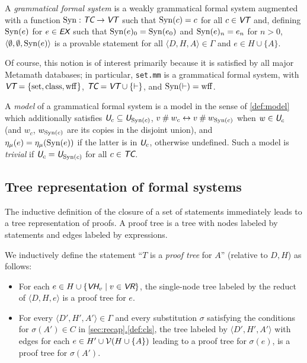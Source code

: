 \documentclass[runningheads,a4paper]{llncs}
\newcommand{\vr}{\textit{\textsf{VR}}} %
\newcommand{\ex}{\textit{\textsf{EX}}} %
\newcommand{\vh}{\textit{\textsf{VH}}} %
\newcommand{\tc}{\textit{\textsf{TC}}} %
\newcommand{\vt}{\textit{\textsf{VT}}} %
\newcommand{\uv}{\textit{\textsf{U}}} %
\newcommand{\ang}[1]{\langle#1\rangle}
\newcommand{\syn}{{\rm Syn}}
\newcommand{\fresh}{\mathbin{\#}}
\begin{document}
\begin{definition}
A {\em grammatical formal system} is a weakly grammatical formal system augmented with a function $\syn:\tc\to\vt$ such that $\syn(c)=c$ for all $c\in\vt$ and, defining $\syn(e)$ for $e\in\ex$ such that $\syn(e)_0=\syn(e_0)$ and $\syn(e)_n=e_n$ for $n>0$, $\ang{\emptyset,\emptyset,\syn(e)}$ is a provable statement for all $\ang{D,H,A}\in\Gamma$ and $e\in H\cup\{A\}$.
\end{definition}

\begin{remark}
Of course, this notion is of interest primarily because it is satisfied by all major Metamath databases; in particular, \texttt{set.mm} is a grammatical formal system, with $\vt={\rm \{set,class,wff\}}$, $\tc=\vt\cup\{\vdash\}$, and $\syn(\vdash)={\rm wff}$.
\end{remark}

\begin{definition}\label{def:gmodel}
A {\em model} of a grammatical formal system is a model in the sense of \autoref{def:model} which additionally satisfies $\uv_c\subseteq\uv_{\syn(c)}$, $v\fresh w_c\leftrightarrow v\fresh w_{\syn(c)}$ when $w\in\uv_c$ (and $w_c$, $w_{\syn(c)}$ are its copies in the disjoint union), and\\ $\eta_\mu(e)=\eta_\mu(\syn(e))$ if the latter is in $\uv_c$, otherwise undefined. Such a model is {\em trivial} if $\uv_c=\uv_{\syn(c)}$ for all $c\in\tc$.
\end{definition}

\subsection{Tree representation of formal systems}\label{sec:trees}
The inductive definition of the closure of a set of statements immediately leads to a tree representation of proofs. A proof tree is a tree with nodes labeled by statements and edges labeled by expressions.

\begin{definition}
We inductively define the statement ``$T$ is a {\em proof tree} for $A$'' (relative to $D,H$) as follows:
\begin{itemize}
  \item For each $e\in H\cup\{\vh_v\mid v\in\vr\}$, the single-node tree labeled by the reduct of $\ang{D,H,e}$ is a proof tree for $e$.
  \item For every $\ang{D',H',A'}\in\Gamma$ and every substitution $\sigma$ satisfying the conditions for $\sigma(A')\in C$ in \hyperref[def:cls]{\autoref*{sec:recap}.\ref*{def:cls}}, the tree labeled by $\ang{D',H',A'}$ with edges for each $e\in H'\cup{\cal V}(H\cup\{A\})$ leading to a proof tree for $\sigma(e)$, is a proof tree for $\sigma(A')$.
\end{itemize}
\end{definition}
\end{document}
